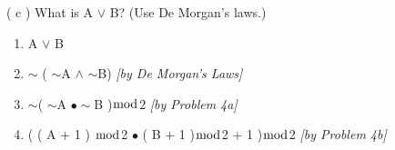\documentclass[11pt]{article}
\begin{document}
	( c ) What is A $\vee$ B? (Use De Morgan's laws.)\\

	\begin{enumerate}
		\item A $\vee$ B
		\item $\sim$ ( $\sim$A $\wedge$ $\sim$B) \textit{[by De Morgan's Laws]}
		\item $\sim$( $\sim$A $\bullet\sim$B )$\bmod$2  \textit{[by Problem 4a]}
		\item ( ( A + 1 ) $\bmod$2 $\bullet$ ( B + 1 )$\bmod$2 + 1 )$\bmod$2 \textit{[by Problem 4b]}
	\end{enumerate}
\end{document}
